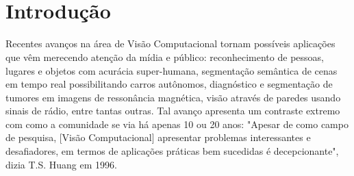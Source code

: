 \documentclass[
12pt, %
a4paper, %
onecolumn, %
]{article}
\begin{document}
\pagestyle{myheadings} %


\thispagestyle{plain} %

\printcover %

\begin{center}

  \horrule{0.5pt} \\[0.4cm] %

  \bigskip

  \textbf{\Large{\doctitle}}
  
  \bigskip
  
  \docauthor

  \bigskip
  

  \horrule{2pt} \\[0.5cm] %

\end{center}

\thispagestyle{plain}
\setcounter{page}{2}
\onehalfspacing

\section{Introdução}


Recentes avanços na área de Visão Computacional tornam possíveis aplicações que vêm merecendo atenção da mídia e público: reconhecimento de pessoas, lugares e objetos com acurácia super-humana, segmentação semântica de cenas em tempo real possibilitando carros autônomos, diagnóstico e segmentação de tumores em imagens de ressonância magnética, visão através de paredes usando sinais de rádio, entre tantas outras. Tal avanço apresenta um contraste extremo com como a comunidade se via há apenas 10 ou 20 anos: "Apesar de como campo de pesquisa, [Visão Computacional] apresentar problemas interessantes e desafiadores, em termos de aplicações práticas bem sucedidas é decepcionante"\cite{huang1996}, dizia T.S. Huang em 1996.  
\end{document}
